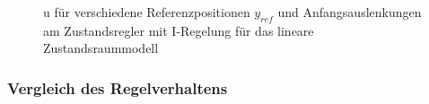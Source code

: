 \begin{figure}[H]
    \centering
    \caption[u für Regler mit I-Regelung (linear)]{u für verschiedene Referenzpositionen $y_{ref}$ und Anfangsauslenkungen am Zustandsregler mit I-Regelung für das lineare Zustandsraummodell}
    \label{fig:Bild24}
\end{figure}

\subsubsection{Vergleich des Regelverhaltens}

